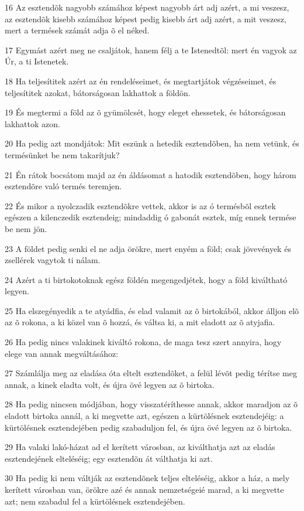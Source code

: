 \par 16 Az esztendõk nagyobb számához képest nagyobb árt adj azért, a mi veszesz, az esztendõk kisebb számához képest pedig kisebb árt adj azért, a mit veszesz, mert a termések számát adja õ el néked.
\par 17 Egymást azért meg ne csaljátok, hanem félj a te Istenedtõl: mert én vagyok az Úr, a ti Istenetek.
\par 18 Ha teljesítitek azért az én rendeléseimet, és megtartjátok végzéseimet, és teljesítitek azokat, bátorságosan lakhattok a földön.
\par 19 És megtermi a föld az õ gyümölcsét, hogy eleget ehessetek, és bátorságosan lakhattok azon.
\par 20 Ha pedig azt mondjátok: Mit eszünk a hetedik esztendõben, ha nem vetünk, és termésünket be nem takarítjuk?
\par 21 Én rátok bocsátom majd az én áldásomat a hatodik esztendõben, hogy három esztendõre való termés teremjen.
\par 22 És mikor a nyolczadik esztendõkre vettek, akkor is az ó termésbõl esztek egészen a kilenczedik esztendeig; mindaddig ó gabonát esztek, míg ennek termése be nem jön.
\par 23 A földet pedig senki el ne adja örökre, mert enyém a föld; csak jövevények és zsellérek vagytok ti nálam.
\par 24 Azért a ti birtokotoknak egész földén megengedjétek, hogy a föld kiváltható legyen.
\par 25 Ha elszegényedik a te atyádfia, és elad valamit az õ birtokából, akkor álljon elõ az õ rokona, a ki közel van õ hozzá, és váltsa ki, a mit eladott az õ atyjafia.
\par 26 Ha pedig nincs valakinek kiváltó rokona, de maga tesz szert annyira, hogy elege van annak megváltásához:
\par 27 Számlálja meg az eladása óta eltelt esztendõket, a felül lévõt pedig térítse meg annak, a kinek eladta volt, és újra övé legyen az õ birtoka.
\par 28 Ha pedig nincsen módjában, hogy visszatéríthesse annak, akkor maradjon az õ eladott birtoka annál, a ki megvette azt, egészen a kürtölésnek esztendejéig: a kürtölésnek esztendejében pedig szabaduljon fel, és újra övé legyen az õ birtoka.
\par 29 Ha valaki lakó-házat ad el kerített városban, az kiválthatja azt az eladás esztendejének elteléséig; egy esztendõn át válthatja ki azt.
\par 30 Ha pedig ki nem váltják az esztendõnek teljes elteléséig, akkor a ház, a mely kerített városban van, örökre azé és annak nemzetségeié marad, a ki megvette azt; nem szabadul fel a kürtölésnek esztendejében.
